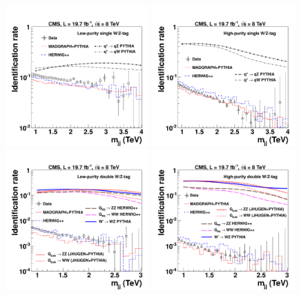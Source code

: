 \begin{figure}[th!b]
\centering
\includegraphics[width=0.49\textwidth]{EXO-12-024/figs/signal-acc-eff/single-tagging-eff-medium.pdf}
\includegraphics[width=0.49\textwidth]{EXO-12-024/figs/signal-acc-eff/single-tagging-eff.pdf}
\includegraphics[width=0.49\textwidth]{EXO-12-024/figs/signal-acc-eff/double-tagging-eff-medium.pdf}
\includegraphics[width=0.49\textwidth]{EXO-12-024/figs/signal-acc-eff/double-tagging-eff.pdf}


\end{figure}
